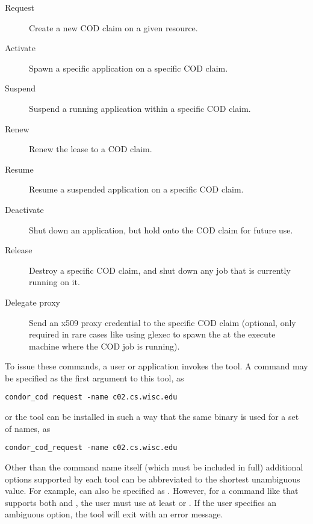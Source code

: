 \begin{description}

\item [Request] Create a new COD claim on a given resource.

\item [Activate] Spawn a specific application on a specific COD claim.

\item [Suspend] Suspend a running application within a specific COD claim.

\item [Renew] Renew the lease to a COD claim.

\item [Resume] Resume a suspended application on a specific COD claim.

\item [Deactivate] Shut down an application, but hold onto the COD claim
  for future use.

\item [Release] Destroy a specific COD claim, and shut down any job that is
  currently running on it.

\item [Delegate proxy] Send an x509 proxy credential to the specific
  COD claim (optional, only required in rare cases like using glexec
  to spawn the  at the execute machine where the COD
  job is running).

\end{description}

To issue these commands, a user or application invokes the 
 tool.
A command may be specified as the first argument to this tool, 
as
\begin{verbatim}
condor_cod request -name c02.cs.wisc.edu
\end{verbatim}
or
the  tool can be installed in such a way that the same
binary is used for a set of names, as
\begin{verbatim}
condor_cod_request -name c02.cs.wisc.edu
\end{verbatim}

Other than the command name itself (which must be included in full)
additional options supported by each tool can be abbreviated to the
shortest unambiguous value.
For example,  can also be specified as .
However, for a command like  that supports both
 and , the user must use at least
 or .
If the user specifies an ambiguous option, the  tool will
exit with an error message.

